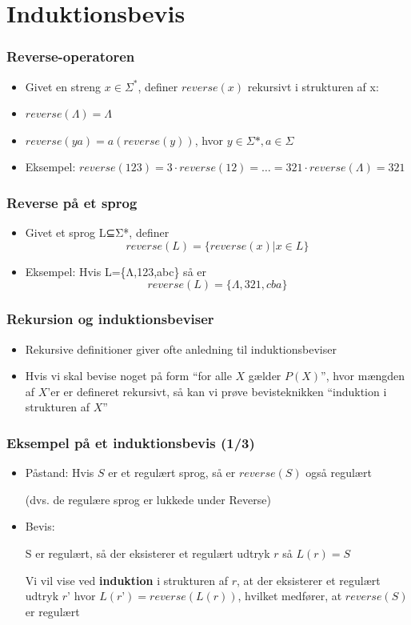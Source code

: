 \documentclass[]{beamer}
\begin{document}
\section{Induktionsbevis}
\begin{frame}
\frametitle{Reverse-operatoren}
\begin{itemize}
\item Givet en streng $x∈Σ^*$, definer $reverse(x)$ rekursivt i strukturen af x:
\item $reverse(Λ) = Λ$
\item $reverse(ya) = a(reverse(y))$, hvor $y∈Σ*, a∈Σ$
\item Eksempel: $reverse(123) = 3·reverse(12) = … = 321·reverse(Λ)= 321$
\end{itemize}
\end{frame}

\begin{frame}
\frametitle{Reverse på et sprog}
\begin{itemize}
\item Givet et sprog L⊆Σ*, definer
\[reverse(L) = \{ reverse(x) | x∈L \}\]
\item Eksempel:
Hvis L=\{Λ,123,abc\} så er
\[reverse(L)=\{Λ,321,cba\}\]
\end{itemize}
\end{frame}

\begin{frame}
\frametitle{Rekursion og induktionsbeviser}
\begin{itemize}[<+->]
\item Rekursive definitioner giver ofte anledning til induktionsbeviser

\item Hvis vi skal bevise noget på form ``for alle $X$ gælder $P(X)$'', hvor
  mængden af $X$’er er defineret rekursivt, så kan vi prøve
  bevisteknikken ``induktion i strukturen af $X$''
\end{itemize}
\end{frame}

\begin{frame}
\frametitle{Eksempel på et induktionsbevis (1/3)}
\begin{itemize}[<+->]
\item Påstand:  Hvis $S$ er et regulært sprog, så er $reverse(S)$ også regulært  

(dvs. de regulære sprog er lukkede under Reverse)
\item Bevis: 

S er regulært, så der eksisterer et regulært udtryk $r$ så $L(r)=S$

Vi vil vise ved \textbf{induktion} i strukturen af $r$, at der eksisterer et
regulært udtryk $r’$ hvor $L(r’)=reverse(L(r))$, hvilket medfører, at
$reverse(S)$ er regulært
\end{itemize}
\end{frame}
\end{document}
